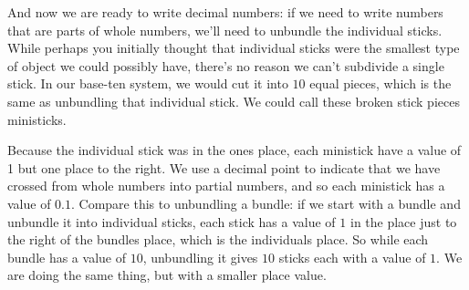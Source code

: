 \documentclass{ximera}
\begin{document}
\begin{image}
\end{image}

And now we are ready to write decimal numbers: if we need to write numbers that are parts of whole numbers, we'll need to unbundle the individual sticks. While perhaps you initially thought that individual sticks were the smallest type of object we could possibly have, there's no reason we can't subdivide a single stick. In our base-ten system, we would cut it into $10$ equal pieces, which is the same as unbundling that individual stick. We could call these broken stick pieces ministicks.

\begin{image}
\end{image}

Because the individual stick was in the ones place, each ministick have a value of 1 but one place to the right. We use a decimal point to indicate that we have crossed from whole numbers into partial numbers, and so each ministick has a value of $0.1$. Compare this to unbundling a bundle: if we start with a bundle and unbundle it into individual sticks, each stick has a value of $1$ in the place just to the right of the bundles place, which is the individuals place. So while each bundle has a value of $10$, unbundling it gives $10$ sticks each with a value of $1$. We are doing the same thing, but with a smaller place value.
\end{document}
